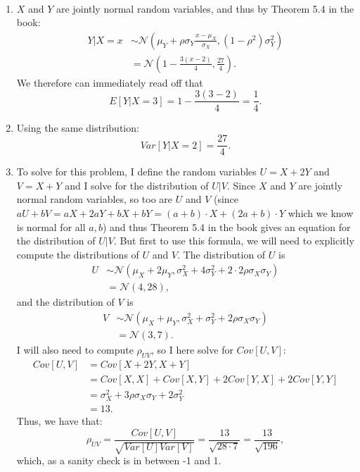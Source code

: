 \begin{problem}{38} $ $
\begin{enumerate}

\item $X$ and $Y$ are jointly normal random variables, and thus by Theorem 5.4 in the book:
\begin{align*}
Y|X=x &\sim \mathcal N \left (\mu_Y+\rho \sigma_Y \frac{x-\mu_X}{\sigma_X}, (1-\rho^2) \sigma_Y^2 \right) \\
&=\mathcal N \left(1-\frac{3(x-2)}{4}, \frac{27}{4} \right).
\end{align*}
We therefore can immediately read off that 
\begin{equation*}
E[Y|X=3] =1 -\frac{3(3-2)}{4} = \frac{1}{4}.
\end{equation*}

\item Using the same distribution:
\begin{equation*}
Var[Y|X=2] =\frac{27}{4}.
\end{equation*}

\item To solve for this problem, I define the random variables $U = X+2Y$ and $V=X+Y$ and I solve for the distribution of $U|V$.  Since $X$ and $Y$ are jointly normal random variables, so too are $U$ and $V$ (since $aU+bV = aX+2aY+bX+bY=(a+b)\cdot X+(2a+b)\cdot Y$ which we know is normal for all $a, b$) and thus Theorem 5.4 in the book gives an equation for the distribution of $U|V$.  But first to use this formula, we will need to explicitly compute the distributions of $U$ and $V$.  The distribution of $U$ is 
\begin{align*}
U &\sim \mathcal N(\mu_X+2\mu_Y, \sigma_X^2+4 \sigma_Y^2+2\cdot2\rho \sigma_X \sigma_Y) \\
& = \mathcal N(4, 28),
\end{align*}
and the distribution of $V$ is
\begin{align*}
V & \sim \mathcal N(\mu_X+\mu_Y, \sigma_X^2+\sigma_Y^2+2\rho \sigma_X \sigma_Y) \\
& = \mathcal N(3, 7).
\end{align*}
I will also need to compute $\rho_{UV}$, so I here solve for $Cov[U, V]$:
\begin{align*}
Cov[U, V] &= Cov[X+2Y, X+Y] \\
&=Cov[X, X]+Cov[X, Y]+2Cov[Y, X]+2Cov[Y, Y] \\
& = \sigma_X^2+3 \rho \sigma_X \sigma_Y+2 \sigma_Y^2 \\
&= 13.
\end{align*}
Thus, we have that:
\begin{equation*}
\rho_{UV} = \frac{Cov[U, V]}{\sqrt{Var[U] Var[V]}} = \frac{13}{\sqrt{28\cdot 7}} = \frac{13}{\sqrt{196}},
\end{equation*}
which, as a sanity check is in between -1 and 1.


\end{enumerate}
\end{problem}
